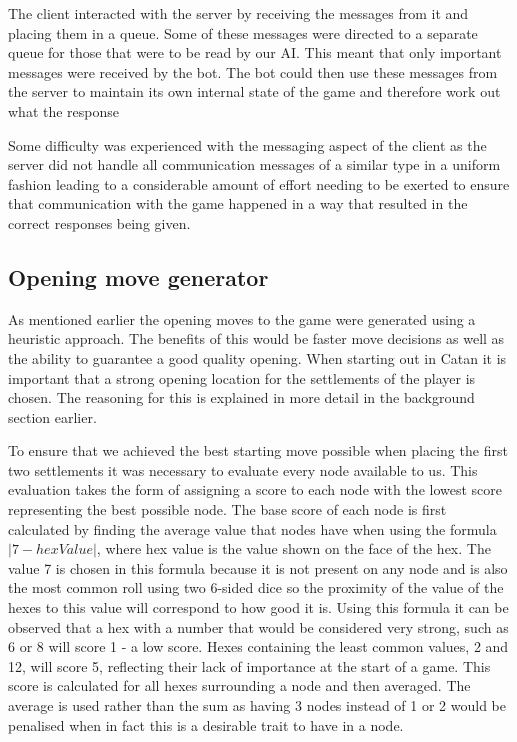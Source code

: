 \documentclass[]{article}
\begin{document}
\par The client interacted with the server by receiving the messages from it and placing them in a queue. Some of these messages were directed to a separate queue for those that were to be read by our AI. This meant that only important messages were received by the bot. The bot could then use these messages from the server to maintain its own internal state of the game and therefore work out what the response

\par Some difficulty was experienced with the messaging aspect of the client as the server did not handle all communication messages of a similar type in a uniform fashion leading to a considerable amount of effort needing to be exerted to ensure that communication with the game happened in a way that resulted in the correct responses being given. 
 
\subsection{Opening move generator}
As mentioned earlier the opening moves to the game were generated using a heuristic approach. The benefits of this would be faster move decisions as well as the ability to guarantee a good quality opening. When starting out in Catan it is important that a strong opening location for the settlements of the player is chosen. The reasoning for this is explained in more detail in the background section earlier.
 
\par To ensure that we achieved the best starting move possible when placing the first two settlements it was necessary to evaluate every node available to us. This evaluation takes the form of assigning a score to each node with the lowest score representing the best possible node. The base score of each node is first calculated by finding the average value that nodes have when using the formula $|7-hexValue|$, where hex value is the value shown on the face of the hex. The value 7 is chosen in this formula because it is not present on any node and is also the most common roll using two 6-sided dice so the proximity of the value of the hexes to this value will correspond to how good it is. Using this formula it can be observed that a hex with a number that would be considered very strong, such as 6 or 8 will score 1 - a low score. Hexes containing the least common values, 2 and 12, will score 5, reflecting their lack of importance at the start of a game. This score is calculated for all hexes surrounding a node and then averaged. The average is used rather than the sum as having 3 nodes instead of 1 or 2 would be penalised when in fact this is a desirable trait to have in a node. 
\end{document}
